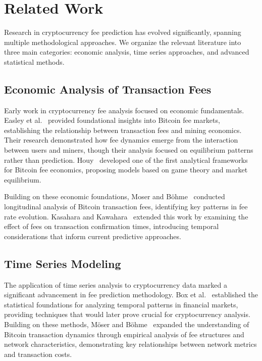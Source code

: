 \section{Related Work}
Research in cryptocurrency fee prediction has evolved significantly, spanning multiple methodological approaches. We organize the relevant literature into three main categories: economic analysis, time series approaches, and advanced statistical methods.

\subsection{Economic Analysis of Transaction Fees}
Early work in cryptocurrency fee analysis focused on economic fundamentals. Easley et al.~\cite{easley2019bitcoin} provided foundational insights into Bitcoin fee markets, establishing the relationship between transaction fees and mining economics. Their research demonstrated how fee dynamics emerge from the interaction between users and miners, though their analysis focused on equilibrium patterns rather than prediction. Houy~\cite{houy2014bitcoin} developed one of the first analytical frameworks for Bitcoin fee economics, proposing models based on game theory and market equilibrium.

Building on these economic foundations, Moser and Böhme~\cite{moser2015trends} conducted longitudinal analysis of Bitcoin transaction fees, identifying key patterns in fee rate evolution. Kasahara and Kawahara~\cite{kasahara2019effect} extended this work by examining the effect of fees on transaction confirmation times, introducing temporal considerations that inform current predictive approaches.

\subsection{Time Series Modeling}
The application of time series analysis to cryptocurrency data marked a significant advancement in fee prediction methodology. Box et al.~\cite{box2015time} established the statistical foundations for analyzing temporal patterns in financial markets, providing techniques that would later prove crucial for cryptocurrency analysis. Building on these methods, Möser and Böhme~\cite{möser2020empirical} expanded the understanding of Bitcoin transaction dynamics through empirical analysis of fee structures and network characteristics, demonstrating key relationships between network metrics and transaction costs.

